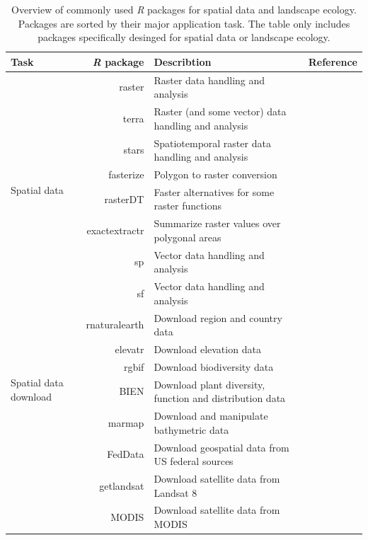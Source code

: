 \documentclass[smallextended]{svjour3}       %
\begin{document}
\begin{table}

\captionsetup{width=2\linewidth}

\caption{Overview of commonly used \textit{R} packages for spatial data and landscape ecology. Packages are sorted by their major application task. The table only includes packages specifically desinged for spatial data or landscape ecology.}

\begin{tabularx}{1.35\linewidth}{lrXr}

\hline
Task & \textit{R} package & Describtion & Reference \\
\hline
\multirow{8}{*}{Spatial data} & raster & Raster data handling and analysis & \cite{Hijmans2019} \\
& terra & Raster (and some vector) data handling and analysis & \cite{Hijmans2021} \\
& stars & Spatiotemporal raster data handling and analysis & \cite{Pebesma2019} \\
& fasterize & Polygon to raster conversion & \cite{Ross2020} \\
& rasterDT & Faster alternatives for some raster functions & \cite{OBrien2020} \\
& exactextractr & Summarize raster values over polygonal areas & \cite{Baston2020} \\
& sp & Vector data handling and analysis & \cite{Pebesma2005,Bivand2013} \\
& sf & Vector data handling and analysis & \cite{Pebesma2018} \\
\hline
\multirow{6}{*}{Spatial data download} & rnaturalearth & Download region and country data & \cite{South2017} \\
& elevatr & Download elevation data & \cite{Hollister2020} \\
& rgbif & Download biodiversity data & \cite{Chamberlain2017} \\
& BIEN & Download plant diversity, function and distribution data & \cite{Maitner2020} \\
& marmap & Download and manipulate bathymetric data & \cite{Pante2013} \\
& FedData & Download geospatial data from US federal sources & \cite{Bocinsky2019} \\
& getlandsat & Download satellite data from Landsat 8 & \cite{Chamberlain2018} \\
& MODIS & Download satellite data from MODIS & \cite{Mattiuzzi2020} \\

\end{tabularx}
\end{table}
\end{document}
